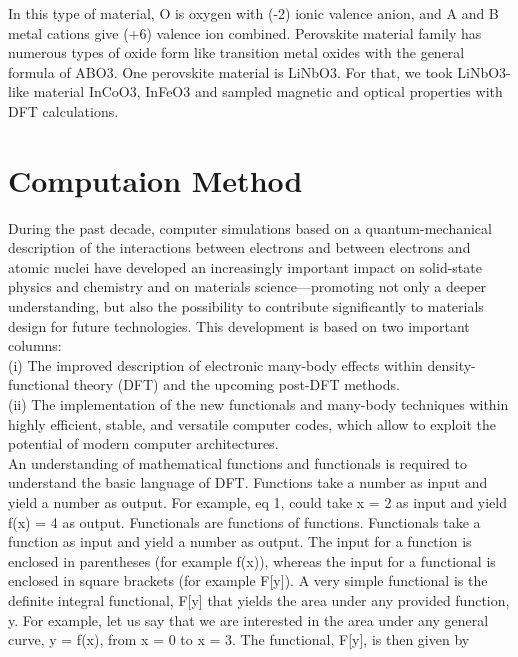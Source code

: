 \documentclass[12pt, letterpaper]{article}
\newcommand*{\1}{\hspace{1pt}}
\begin{document}
    In this type of material, O is oxygen with (-2) ionic valence anion, and A and B metal 
    cations give (+6) valence ion combined. Perovskite material family has numerous types of oxide form like transition metal oxides with the general formula of ABO3\cite{r2}.
    One perovskite material is LiNbO3. For that, we took LiNbO3-like material InCoO3, InFeO3 and sampled magnetic and optical properties with DFT calculations\cite{r3}. 
    
    \section{Computaion Method}
    During the past decade, computer simulations based on a quantum-mechanical description of the interactions between electrons 
    and between electrons and atomic nuclei have developed an increasingly important impact on solid-state physics and chemistry 
    and on materials science—promoting not only a deeper understanding, but also the possibility to contribute significantly to 
    materials design for future technologies. This development is based on two important columns: \\
    
    (i) The improved description of electronic many-body effects within density-functional theory (DFT) and the upcoming post-DFT 
    methods. \\ 
    (ii) The implementation of the new functionals and many-body techniques within highly efficient, stable, and versatile 
    computer codes, which allow to exploit the potential of modern computer architectures. \\ 

    An understanding of mathematical functions and functionals is
    required to understand the basic language of DFT\cite{r15}. Functions
    take a number as input and yield a number as output. For
    example, eq 1, could take x = 2 as input and yield f(x) = 4 as
    output. Functionals are functions of functions. Functionals take
    a function as input and yield a number as output. The input for
    a function is enclosed in parentheses (for example f(x)),
    whereas the input for a functional is enclosed in square brackets
    (for example F[y]). A very simple functional is the deﬁnite
    integral functional, F[y] that yields the area under any provided
    function, y. For example, let us say that we are interested in the
    area under any general curve, y = f(x), from x = 0 to x = 3. The
    functional, F[y], is then given by 
    
\end{document}
